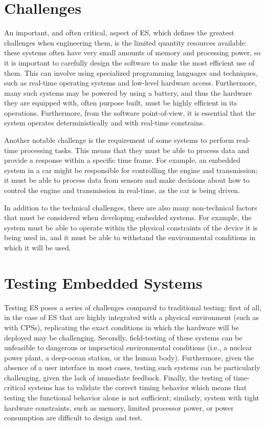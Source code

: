 \section {Challenges}
An important, and often critical, aspect of ES, which defines the greatest challenges when engineering them, is the limited quantity resources available: these systems often have very small amounts of memory and processing power, so it is important to carefully design the software to make the most efficient use of them. This can involve using specialized programming languages and techniques, such as real-time operating systems and low-level hardware access. Furthermore, many such systems may be powered by using a battery, and thus the hardware they are equipped with, often purpose built, must be highly efficient in its operations. Furthermore, from the software point-of-view, it is essential that the system operates deterministically and with real-time constrains.

Another notable challenge is the requirement of some systems to perform real-time processing tasks. This means that they must be able to process data and provide a response within a specific time frame. For example, an embedded system in a car might be responsible for controlling the engine and transmission; it must be able to process data from sensors and make decisions about how to control the engine and transmission in real-time, as the car is being driven.

In addition to the technical challenges, there are also many non-technical factors that must be considered when developing embedded systems. For example, the system must be able to operate within the physical constraints of the device it is being used in, and it must be able to withstand the environmental conditions in which it will be used.



\section{Testing Embedded Systems}
Testing ES poses a series of challenges compared to traditional testing: first of all, in the case of ES that are highly integrated with a physical environment (such as with CPSs), replicating the exact conditions in which the hardware will be deployed may be challenging. Secondly, field-testing of these systems can be unfeasible to dangerous or impractical environmental conditions (i.e., a nuclear power plant, a deep-ocean station, or the human body). Furthermore, given the absence of a user interface in most cases, testing such systems can be particularly challenging, given the lack of immediate feedback. Finally, the testing of time-critical systems has to validate the correct timing behavior which means that testing the functional behavior alone is not sufficient; similarly, system with tight hardware constraints, such as memory, limited processor power, or power consumption are difficult to design and test.

